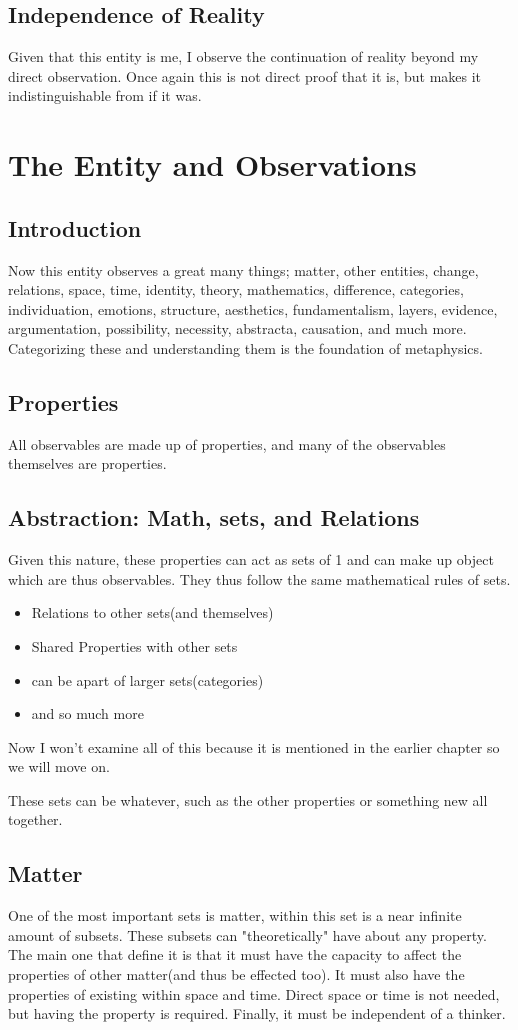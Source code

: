 \subsection{Independence of Reality}
Given that this entity is me, I observe the continuation of reality beyond my direct observation. Once again this is not direct proof that it is, but
makes it indistinguishable from if it was.
\section{The Entity and Observations}
\subsection{Introduction}
Now this entity observes a great many things; matter, other entities, change, relations, space, time, identity, theory, mathematics, difference,
categories, individuation, emotions, structure, aesthetics, fundamentalism, layers, evidence, argumentation, possibility, necessity, abstracta,
causation, and much more. Categorizing these and understanding them is the foundation of metaphysics.

\subsection{Properties}
All observables are made up of properties, and many of the observables themselves are properties.
\subsection{Abstraction: Math, sets, and Relations}
Given this nature, these properties can act as sets of 1 and can make up object which are thus observables. They thus follow the same mathematical rules
of sets.
\begin{itemize}
    \item Relations to other sets(and themselves)
    \item Shared Properties with other sets
    \item can be apart of larger sets(categories)
    \item and so much more
\end{itemize}
Now I won't examine all of this because it is mentioned in the earlier chapter so we will move on.

These sets can be whatever, such as the other properties or something new all together.

\subsection{Matter}
One of the most important sets is matter, within this set is a near infinite amount of subsets. These subsets can "theoretically" have about any property.
The main one that define it is that it must have the capacity to affect the properties of other matter(and thus be effected too). It must also have the
properties of existing within space and time. Direct space or time is not needed, but having the property is required. Finally, it must be independent
of a thinker.

